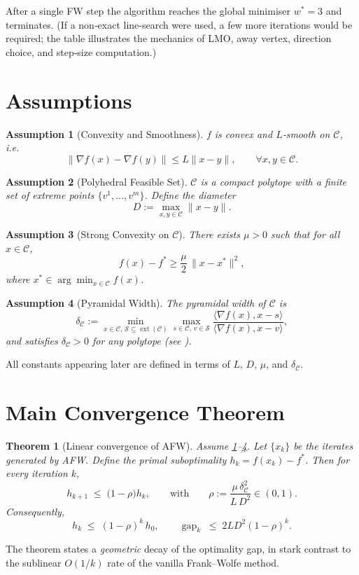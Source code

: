 \documentclass{article}
\newtheorem{theorem}{Theorem}
\newtheorem{assumption}{Assumption}
\newcommand{\C}{\mathcal{C}}
\newcommand{\gap}{\operatorname{gap}}
\begin{document}
After a single FW step the algorithm reaches the global minimiser $w^{*}=3$ and terminates. (If a non‑exact line‑search were used, a few more iterations would be required; the table illustrates the mechanics of LMO, away vertex, direction choice, and step‑size computation.)

\section*{Assumptions}
\begin{assumption}[Convexity and Smoothness]\label{assump:smooth}
$f$ is convex and $L$‑smooth on $\C$, i.e.
\[
\|\nabla f(x)-\nabla f(y)\| \le L\|x-y\|,\qquad \forall x,y\in\C .
\]
\end{assumption}
\begin{assumption}[Polyhedral Feasible Set]\label{assump:poly}
$\C$ is a compact polytope with a finite set of extreme points $\{v^{1},\dots ,v^{m}\}$.
Define the \emph{diameter}
\[
D:=\max_{x,y\in\C}\|x-y\|.
\]
\end{assumption}
\begin{assumption}[Strong Convexity on $\C$]\label{assump:strong}
There exists $\mu>0$ such that for all $x\in\C$,
\[
f(x)-f^{*}\ge \frac{\mu}{2}\,\|x-x^{*}\|^{2},
\]
where $x^{*}\in\arg\min_{x\in\C}f(x)$.
\end{assumption}
\begin{assumption}[Pyramidal Width]\label{assump:pyr}
The \emph{pyramidal width} of $\C$ is
\[
\delta_{\C}:= \min_{x\in\C,\,\mathcal{S}\subseteq\operatorname{ext}(\C)} 
\max_{s\in\C,\,v\in\mathcal{S}} \frac{\langle \nabla f(x), x-s\rangle}{\langle \nabla f(x), x-v\rangle},
\]
and satisfies $\delta_{\C}>0$ for any polytope (see \cite{lacoste2015linear}).
\end{assumption}

All constants appearing later are defined in terms of $L$, $D$, $\mu$, and $\delta_{\C}$.

\section*{Main Convergence Theorem}
\begin{theorem}[Linear convergence of AFW]\label{thm:linear}
Assume \ref{assump:smooth}--\ref{assump:pyr}. Let $\{x_{k}\}$ be the iterates generated by AFW.
Define the primal suboptimality $h_{k}=f(x_{k})-f^{*}$.
Then for every iteration $k$,
\[
h_{k+1}\;\le\;\bigl(1-\rho\bigr)h_{k},
\qquad\text{with}\qquad 
\rho:=\frac{\mu\,\delta_{\C}^{2}}{L\,D^{2}} \in (0,1).
\tag{6}
\]
Consequently,
\[
h_{k}\;\le\;(1-\rho)^{k}\,h_{0},\qquad 
\gap_{k}\;\le\;2L D^{2}(1-\rho)^{k}.
\]
\end{theorem}
The theorem states a \emph{geometric} decay of the optimality gap, in stark contrast to the sublinear $O(1/k)$ rate of the vanilla Frank–Wolfe method.
\end{document}
